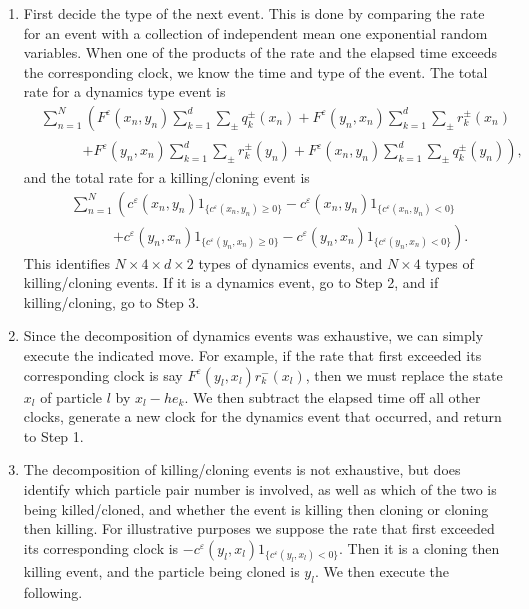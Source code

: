 \documentclass[english,11pt]{article}%
\numberwithin{equation}{section}
\numberwithin{example}{section}
\numberwithin{theorem}{section}
\begin{document}
\begin{enumerate}
\item First decide the type of the next event. This is done by comparing the
rate for an event with a collection of independent mean one exponential random
variables. When one of the products of the rate and the elapsed time exceeds
the corresponding clock, we know the time and type of the event. The total
rate for a dynamics type event is
\begin{align*}
&  \sum_{n=1}^{N}\left(  F^{\varepsilon}(x_{n},y_{n})\sum_{k=1}^{d}\sum_{\pm
}q_{k}^{\pm}(x_{n})+F^{\varepsilon}(y_{n},x_{n})\sum_{k=1}^{d}\sum_{\pm}%
r_{k}^{\pm}(x_{n})\right. \\
&  \quad\quad\quad\left.  +F^{\varepsilon}(y_{n},x_{n})\sum_{k=1}^{d}\sum
_{\pm}r_{k}^{\pm}(y_{n})+F^{\varepsilon}(x_{n},y_{n})\sum_{k=1}^{d}\sum_{\pm
}q_{k}^{\pm}(y_{n})\right)  ,
\end{align*}
and the total rate for a killing/cloning event is
\begin{align*}
&  \sum_{n=1}^{N}\left(  c^{\varepsilon}(x_{n},y_{n})1_{\{c^{\varepsilon
}(x_{n},y_{n})\geq0\}}-c^{\varepsilon}(x_{n},y_{n})1_{\{c^{\varepsilon}%
(x_{n},y_{n})<0\}}\right. \\
&  \quad\quad\quad\left.  +c^{\varepsilon}(y_{n},x_{n})1_{\{c^{\varepsilon
}(y_{n},x_{n})\geq0\}}-c^{\varepsilon}(y_{n},x_{n})1_{\{c^{\varepsilon}%
(y_{n},x_{n})<0\}}\right)  .
\end{align*}
This identifies $N\times4\times d\times2$ types of dynamics events, and
$N\times4$ types of killing/cloning events. If it is a dynamics event, go to
Step 2, and if killing/cloning, go to Step 3.

\item Since the decomposition of dynamics events was exhaustive, we can simply
execute the indicated move. For example, if the rate that first exceeded its
corresponding clock is say $F^{\varepsilon}(y_{l},x_{l})r_{k}^{-}(x_{l})$,
then we must replace the state $x_{l}$ of particle $l$ by $x_{l}-he_{k}$. We
then subtract the elapsed time off all other clocks, generate a new clock for
the dynamics event that occurred, and return to Step 1.

\item The decomposition of killing/cloning events is not exhaustive, but does
identify which particle pair number is involved, as well as which of the two
is being killed/cloned, and whether the event is killing then cloning or
cloning then killing. For illustrative purposes we suppose the rate that first
exceeded its corresponding clock is $-c^{\varepsilon}(y_{l},x_{l}%
)1_{\{c^{\varepsilon}(y_{l},x_{l})<0\}}$. Then it is a cloning then killing
event, and the particle being cloned is $y_{l}$. We then execute the following.


\end{enumerate}
\end{document}
